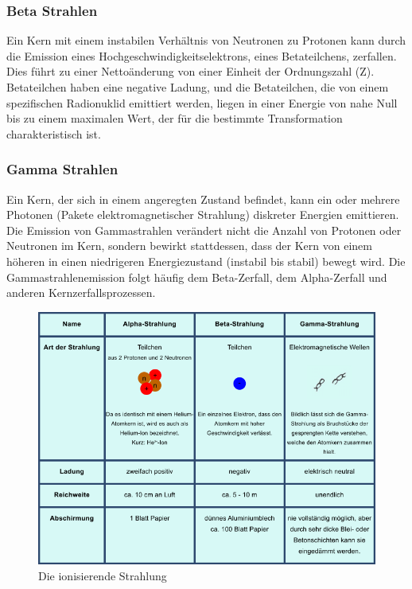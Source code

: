  \subsubsection{Beta Strahlen}
 Ein Kern mit einem instabilen Verhältnis von Neutronen zu Protonen kann durch die Emission eines Hochgeschwindigkeitselektrons, eines Betateilchens, zerfallen. Dies führt zu einer Nettoänderung von einer Einheit der Ordnungszahl (Z). Betateilchen haben eine negative Ladung, und die Betateilchen, die von einem spezifischen Radionuklid emittiert werden, liegen in einer Energie von nahe Null bis zu einem maximalen Wert, der für die bestimmte Transformation charakteristisch ist.
 \subsubsection{Gamma Strahlen}
 Ein Kern, der sich in einem angeregten Zustand befindet, kann ein oder mehrere Photonen (Pakete elektromagnetischer Strahlung) diskreter Energien emittieren. Die Emission von Gammastrahlen verändert nicht die Anzahl von Protonen oder Neutronen im Kern, sondern bewirkt stattdessen, dass der Kern von einem höheren in einen niedrigeren Energiezustand (instabil bis stabil) bewegt wird. Die Gammastrahlenemission folgt häufig dem Beta-Zerfall, dem Alpha-Zerfall und anderen Kernzerfallsprozessen.

\begin{figure}[htb]
  \centering  
  \includegraphics[scale=0.9]{img/strahlen.png}
  \caption{Die ionisierende Strahlung}
  \label{fig:strahlen}
\end{figure}
